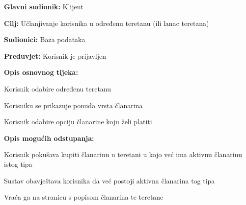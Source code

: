 					\noindent {}
					\begin{packed_item}
	
						\item \textbf{Glavni sudionik: }Klijent
						\item  \textbf{Cilj:} Učlanjivanje korisnika u određenu teretanu (ili lanac teretana)
						\item  \textbf{Sudionici:} Baza podataka
						\item  \textbf{Preduvjet:} Korisnik je prijavljen
						\item  \textbf{Opis osnovnog tijeka:}
						
						\item[] \begin{packed_enum}
	
							\item Korisnik odabire određenu teretanu
							\item Korisniku se prikazuje ponuda vrsta članarina
							\item Korisnik odabire opciju članarine koju želi platiti
						\end{packed_enum}
					
						\item  \textbf{Opis mogućih odstupanja:}
						
						\item[] \begin{packed_item}
	
						\item[-]
						Korisnik pokušava kupiti članarinu u teretani u kojo već ima aktivnu članarinu istog tipa
							\item[] \begin{packed_enum}
								
								\item Sustav obavještava korisnika da već postoji aktivna članarina tog tipa
								\item Vraća ga na stranicu s popisom članarina te teretane
							\end{packed_enum}
						\end{packed_item}
					\end{packed_item}
				
